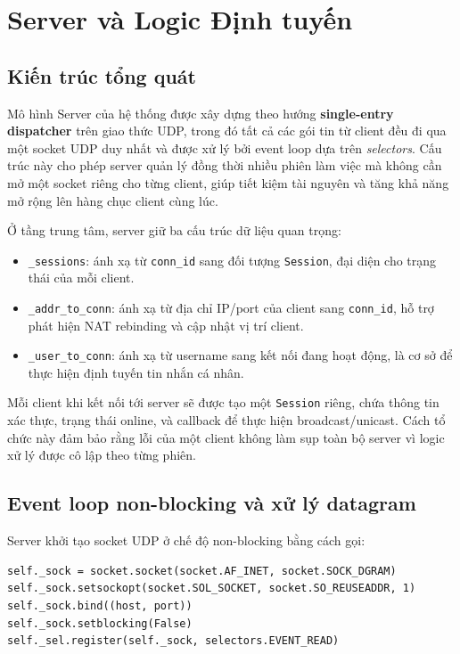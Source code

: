 \setcounter{section}{2}
\section{Server và Logic Định tuyến}

\subsection{Kiến trúc tổng quát}
Mô hình Server của hệ thống được xây dựng theo hướng \textbf{single-entry dispatcher} trên giao thức UDP, trong đó tất cả các gói tin từ client đều đi qua một socket UDP duy nhất và được xử lý bởi event loop dựa trên \textit{selectors}. Cấu trúc này cho phép server quản lý đồng thời nhiều phiên làm việc mà không cần mở một socket riêng cho từng client, giúp tiết kiệm tài nguyên và tăng khả năng mở rộng lên hàng chục client cùng lúc.

Ở tầng trung tâm, server giữ ba cấu trúc dữ liệu quan trọng:
\begin{itemize}
    \item \texttt{\_sessions}: ánh xạ từ \texttt{conn\_id} sang đối tượng \texttt{Session}, đại diện cho trạng thái của mỗi client.
    \item \texttt{\_addr\_to\_conn}: ánh xạ từ địa chỉ IP/port của client sang \texttt{conn\_id}, hỗ trợ phát hiện NAT rebinding và cập nhật vị trí client.
    \item \texttt{\_user\_to\_conn}: ánh xạ từ username sang kết nối đang hoạt động, là cơ sở để thực hiện định tuyến tin nhắn cá nhân.
\end{itemize}

Mỗi client khi kết nối tới server sẽ được tạo một \texttt{Session} riêng, chứa thông tin xác thực, trạng thái online, và callback để thực hiện broadcast/unicast. Cách tổ chức này đảm bảo rằng lỗi của một client không làm sụp toàn bộ server vì logic xử lý được cô lập theo từng phiên.

\subsection{Event loop non-blocking và xử lý datagram}
Server khởi tạo socket UDP ở chế độ non-blocking bằng cách gọi:\newline
\begin{verbatim}
self._sock = socket.socket(socket.AF_INET, socket.SOCK_DGRAM)
self._sock.setsockopt(socket.SOL_SOCKET, socket.SO_REUSEADDR, 1)
self._sock.bind((host, port))
self._sock.setblocking(False)
self._sel.register(self._sock, selectors.EVENT_READ)
\end{verbatim}

